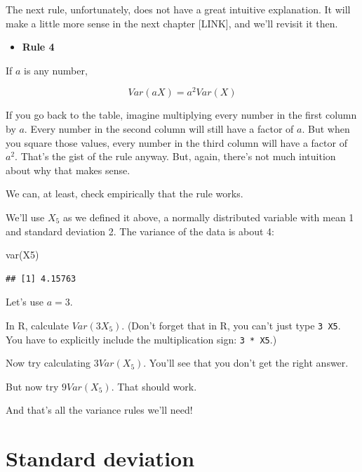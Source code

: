 \documentclass[
]{book}
\newenvironment{Shaded}{\begin{snugshade}}{\end{snugshade}}
\newcommand{\FunctionTok}[1]{\textcolor[rgb]{0.00,0.00,0.00}{#1}}
\newcommand{\NormalTok}[1]{#1}
\providecommand{\tightlist}{%
  \setlength{\itemsep}{0pt}\setlength{\parskip}{0pt}}
\begin{document}
The next rule, unfortunately, does not have a great intuitive explanation. It will make a little more sense in the next chapter {[}LINK{]}, and we'll revisit it then.

\begin{itemize}
\tightlist
\item
  \textbf{Rule 4}
\end{itemize}

If \(a\) is any number,

\[
Var\left(aX\right) = a^2 Var\left(X\right)
\]

If you go back to the table, imagine multiplying every number in the first column by \(a\). Every number in the second column will still have a factor of \(a\). But when you square those values, every number in the third column will have a factor of \(a^{2}\). That's the gist of the rule anyway. But, again, there's not much intuition about why that makes sense.

We can, at least, check empirically that the rule works.

We'll use \(X_{5}\) as we defined it above, a normally distributed variable with mean 1 and standard deviation 2. The variance of the data is about 4:

\begin{Shaded}
\begin{Highlighting}[]
\FunctionTok{var}\NormalTok{(X5)}
\end{Highlighting}
\end{Shaded}

\begin{verbatim}
## [1] 4.15763
\end{verbatim}

Let's use \(a = 3\).

In R, calculate \(Var\left(3X_{5}\right)\). (Don't forget that in R, you can't just type \texttt{3\ X5}. You have to explicitly include the multiplication sign: \texttt{3\ *\ X5}.)

Now try calculating \(3 Var\left(X_{5}\right)\). You'll see that you don't get the right answer.

But now try \(9 Var\left(X_{5}\right)\). That should work.

And that's all the variance rules we'll need!

\hypertarget{variance-sd}{%
\section{Standard deviation}\label{variance-sd}}
\end{document}
